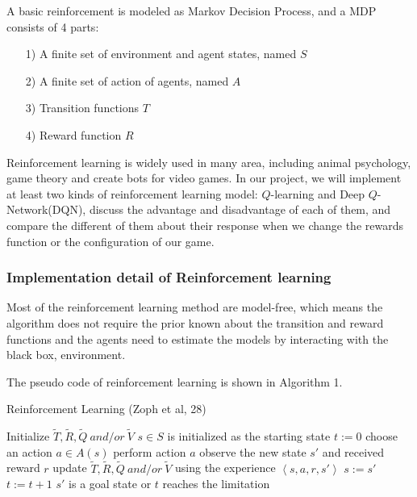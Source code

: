 \documentclass[14pt]{extarticle}
\begin{document}
A basic reinforcement is modeled as Markov Decision Process, and a MDP consists of 4 parts:
\begin{itemize}
    \item [1)] A finite set of environment and agent states, named $S$
    \item [2)] A finite set of action of agents, named $A$
    \item [3)] Transition functions $T$
    \item [4)] Reward function $R$
\end{itemize}
Reinforcement learning is widely used in many area, including animal psychology, game theory and create bots for video games. In our project, we will implement at least two kinds of reinforcement learning  model: $Q$-learning and Deep $Q$-Network(DQN), discuss the advantage and disadvantage of each of them, and compare the different of them about their response when we change the rewards function or the configuration of our game.

\subsubsection*{\small Implementation detail of Reinforcement learning}

Most of the reinforcement learning method are model-free, which means the algorithm does not require the prior  known about the transition and reward functions and the agents need to estimate the models by interacting with the black box, environment.

The pseudo code of reinforcement learning is shown in Algorithm 1.

\begin{algorithm}
    \caption{Reinforcement Learning (Zoph et al, 28) }\label{euclid}
    \begin{algorithmic}[1]
    \State Initialize $\tilde{T}, \tilde{R}, \tilde{Q} \ and/or\  \tilde{V}$
        \State $s \in S$ is initialized as the starting state
        \State $t := 0$
        \Repeat
            \State choose an action $a \in A(s)$
            \State perform action $a$
            \State observe the new state $s'$ and received reward $r$
            \State update $\tilde{T}, \tilde{R}, \tilde{Q} \ and/or\  \tilde{V}$
            \State using the experience $\left\langle s,a,r,s'\right\rangle $
            \State $s := s'$
            \State $t := t + 1$
        \Until $s'$ is a goal state or $t$ reaches the limitation
    \EndFor
    \end{algorithmic}
\end{algorithm}
\end{document}
